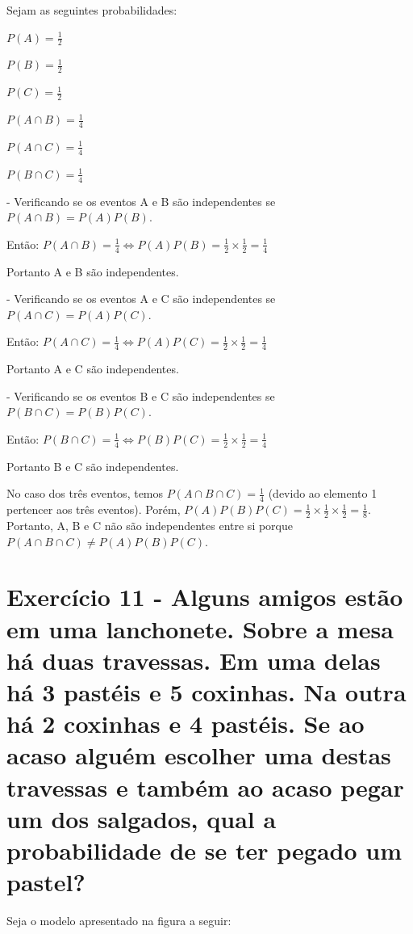 \documentclass[12pt]{article}
\begin{document}
Sejam as seguintes probabilidades:

$\displaystyle P(A)=\frac{1}{2}$

$\displaystyle P(B)=\frac{1}{2}$

$\displaystyle P(C)=\frac{1}{2}$

$\displaystyle P(A \cap B)=\frac{1}{4}$

$\displaystyle P(A \cap C)=\frac{1}{4}$

$\displaystyle P(B \cap C)=\frac{1}{4}$ \bigskip

- Verificando se os eventos A e B são independentes se $\displaystyle P(A \cap B)=P(A)P(B)$.

Então: $\displaystyle P(A \cap B)=\frac{1}{4} \Longleftrightarrow P(A)P(B)=\frac{1}{2} \times \frac{1}{2} =\frac{1}{4}$

Portanto A e B são independentes. \bigskip

- Verificando se os eventos A e C são independentes se $\displaystyle P(A \cap C)=P(A)P(C)$.

Então: $\displaystyle P(A \cap C)=\frac{1}{4} \Longleftrightarrow P(A)P(C)=\frac{1}{2} \times \frac{1}{2} =\frac{1}{4}$

Portanto A e C são independentes.

- Verificando se os eventos B e C são independentes se $\displaystyle P(B \cap C)=P(B)P(C)$.

Então: $\displaystyle P(B \cap C)=\frac{1}{4} \Longleftrightarrow P(B)P(C)=\frac{1}{2} \times \frac{1}{2} =\frac{1}{4}$

Portanto B e C são independentes.

No caso dos três eventos, temos $\displaystyle P(A \cap B \cap C)=\frac{1}{4}$ (devido ao elemento 1 pertencer aos três eventos). Porém, $\displaystyle P(A)P(B)P(C)=\frac{1}{2} \times \frac{1}{2} \times \frac{1}{2} = \frac{1}{8}$. Portanto, A, B e C não são independentes entre si porque $\displaystyle P(A \cap B \cap C) \neq P(A)P(B)P(C)$.

\section*{Exercício 11 - Alguns amigos estão em uma lanchonete. Sobre a mesa há duas travessas. Em uma delas há 3 pastéis e 5 coxinhas. Na outra há 2 coxinhas e 4 pastéis. Se ao acaso alguém escolher uma destas travessas e também ao acaso pegar um dos salgados, qual a probabilidade de se ter pegado um pastel?}

Seja o modelo apresentado na figura a seguir:
\end{document}
